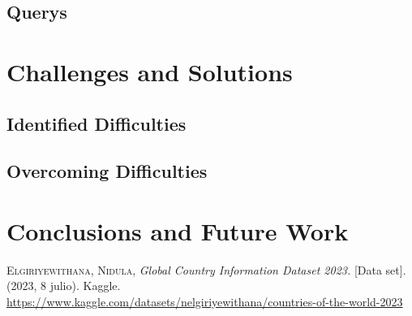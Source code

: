\documentclass[fleqn,11pt]{article}
\begin{document}
\begin{itemize}

\subsection{Querys}

\section{Challenges and Solutions}

\subsection{Identified Difficulties}



\subsection{Overcoming Difficulties}



\section{Conclusions and Future Work}

\newpage
\begin{thebibliography}{10}
	
 \textsc{Elgiriyewithana, Nidula}, \textit{Global Country Information Dataset 2023.} [Data set]. (2023, 8 julio). Kaggle. \newline
\small{\url{https://www.kaggle.com/datasets/nelgiriyewithana/countries-of-the-world-2023}}


\end{thebibliography}
\end{itemize}
\end{document}
